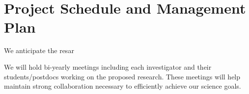\section{Project Schedule and Management Plan}

We anticipate the resar

We will  hold bi-yearly meetings including each investigator and their students/postdocs working on the proposed research. These meetings will help maintain strong collaboration necessary to efficiently achieve our science goals.
